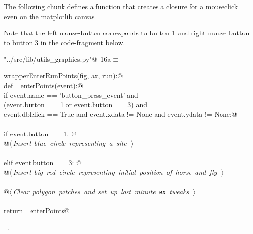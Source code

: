 \documentclass[11.5pt]{report}
\begin{document}
The following chunk defines a function that creates a closure for a mouseclick 
even on the matplotlib canvas. 

Note that the left mouse-button corresponds to button 1 and right mouse button
to button 3 in the code-fragment below. 


\begin{flushleft} \small\label{scrap7}\raggedright\small
{} \verb@"../src/lib/utils_graphics.py"@\nobreak\ {\footnotesize {16a}}$\equiv$
\vspace{-1ex}
\begin{list}{}{} \item
\mbox{}\verb@def wrapperEnterRunPoints(fig, ax, run):@\\
\mbox{}\verb@    def _enterPoints(event):@\\
\mbox{}\verb@        if event.name      == 'button_press_event'          and \@\\
\mbox{}\verb@           (event.button   == 1 or event.button == 3)       and \@\\
\mbox{}\verb@            event.dblclick == True and event.xdata  != None and event.ydata  != None:@\\
\mbox{}\verb@@\\
\mbox{}\verb@             if event.button == 1:  @\\
\mbox{}\verb@                 @\hbox{$\langle\,${\itshape Insert blue circle representing a site}\nobreak\ {\footnotesize {}}$\,\rangle$}\verb@@\\
\mbox{}\verb@@\\
\mbox{}\verb@             elif event.button == 3:  @\\
\mbox{}\verb@                 @\hbox{$\langle\,${\itshape Insert big red circle representing initial position of horse and fly}\nobreak\ {\footnotesize {}}$\,\rangle$}\verb@@\\
\mbox{}\verb@@\\
\mbox{}\verb@             @\hbox{$\langle\,${\itshape Clear polygon patches and set up last minute \verb|ax| tweaks}\nobreak\ {\footnotesize {}}$\,\rangle$}\verb@@\\
\mbox{}\verb@@\\
\mbox{}\verb@    return _enterPoints@\\
\mbox{}\verb@@{\NWsep}
\end{list}
\vspace{-1.5ex}
\footnotesize
\begin{list}{}{\setlength{\itemsep}{-\parsep}\setlength{\itemindent}{-\leftmargin}}
\item \NWtxtFileDefBy\ .

\item{}
\end{list}
\vspace{4ex}
\end{flushleft}
\end{document}
